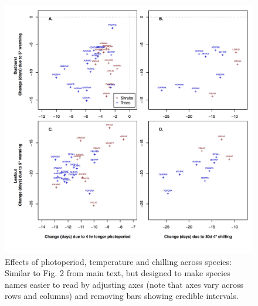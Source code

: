 \documentclass{article}
\begin{document}
\begin{figure}
\label{figS5}
\includegraphics[width=1\textwidth]{Fig2_4panel_ZoomSupp.png}
\caption{Effects of photoperiod, temperature and chilling across species: Similar to Fig. 2 from main text, but designed to make species names easier to read by adjusting axes (note that axes vary across rows and columns) and removing bars showing credible intervals. }
\end{figure}
\end{document}
